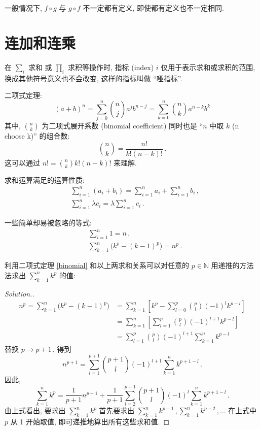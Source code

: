 \documentclass{book}
\newcommand{\compose}{\circ}
\newenvironment{solution}{\begin{proof}[Solution.]}{\end{proof}}
\numberwithin{equation}{section}
\numberwithin{figure}{section}
\theoremstyle{definition}
\newcommand{\dq}[1]{``#1''}
\begin{document}
一般情况下, $f\compose g$ 与 $g\compose f$ 不一定都有定义, 即使都有定义也不一定相同.

\section{连加和连乘}
在 $\displaystyle\sum_i$ 求和 或 $\displaystyle\prod_i$ 求积等操作时, 指标 (index) $i$ 仅用于表示求和或求积的范围, 换成其他符号意义也不会改变, 这样的指标叫做 \dq{哑指标}.

二项式定理:
\begin{equation}\label{binomial}
  (a+b)^n=\sum_{j=0}^{n}\binom{n}{j}a^j b^{n-j}=\sum_{k=0}^{n}\binom{n}{k}a^{n-k}b^k
\end{equation}
其中, $\binom{n}{k}$ 为二项式展开系数 (binomial coefficient) 同时也是 \dq{$n$ 中取 $k$ (n choose k)} 的组合数:
\begin{equation*}
  \binom{n}{k}=\frac{n!}{k!(n-k)!}\,.
\end{equation*}
这可以通过 $n!=\binom{n}{k}k!(n-k)!$ 来理解.

求和运算满足的运算性质:
\begin{align*}
  &\sum_{i=1}^{n}(a_i+b_i)=\sum_{i=1}^{n}a_i+\sum_{i=1}^{n}b_i\,,\\
  &\sum_{i=1}^{n}\lambda c_i=\lambda\sum_{i=1}^{n}c_i\,.
\end{align*}

一些简单却易被忽略的等式:
\begin{align}
  &\sum_{i=1}^{n}1=n\,,\label{sum1nn}\\
  &\sum_{k=1}^{n}\big(k^p-(k-1)^p\big)=n^p\,.
\end{align}

利用二项式定理 \cref{binomial} 和以上两求和关系可以对任意的 $p\in \mathbb{N}$ 用递推的方法法求出 $\displaystyle\sum_{k=1}^{n}k^p$ 的值:
\begin{solution}
  \begin{align*}
    n^p=\sum_{k=1}^{n}\big(k^p-(k-1)^p\big)&=\sum_{k=1}^{n}\left[ k^p-\sum_{l=0}^{p}\binom{p}{l}(-1)^l k^{p-l} \right]\\
    &=\sum_{k=1}^{n}\left[ \sum_{l=1}^{p}\binom{p}{l}(-1)^{l+1}k^{p-l} \right]\\
    &=\sum_{l=1}^{p}\binom{p}{l}(-1)^{l+1}\sum_{k=1}^{n}k^{p-l}
  \end{align*}
  替换 $p\rightarrow p+1$\,, 得到
  \begin{equation*}
    n^{p+1}=\sum_{l=1}^{p+1}\binom{p+1}{l}(-1)^{l+1}\sum_{k=1}^{n}k^{p+1-l}\,.
  \end{equation*}
  因此,
  \begin{equation*}
    \sum_{k=1}^{n}k^p=\frac{1}{p+1}n^{p+1}+\frac{1}{p+1}\sum_{l=2}^{p+1}\binom{p+1}{l}(-1)^l\sum_{k=1}^{n}k^{p+1-l}\,.
  \end{equation*}
  由上式看出, 要求出 $\sum_{k=1}^{n}k^p$ 首先要求出 $\sum_{k=1}^{n}k^{p-1}\,,\sum_{k=1}^{n}k^{p-2}\,,\dots$  在上式中 $p$ 从 1 开始取值, 即可递推地算出所有这些求和值.
\end{solution}
\end{document}
